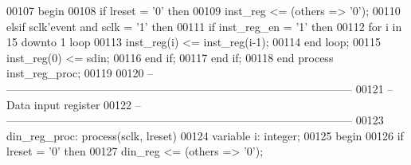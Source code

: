 \begin{DoxyCode}
00107 \textcolor{vhdlkeyword}{    begin}
00108         \textcolor{keywordflow}{if} \textcolor{vhdlchar}{lreset} \textcolor{vhdlchar}{=} \textcolor{vhdlchar}{'}\textcolor{vhdllogic}{}\textcolor{vhdllogic}{0}\textcolor{vhdlchar}{'} \textcolor{keywordflow}{then}
00109             inst\_reg <= (\textcolor{keywordflow}{others} => '0');
00110         \textcolor{keywordflow}{elsif} \textcolor{vhdlchar}{sclk}\textcolor{vhdlchar}{'}\textcolor{vhdlkeyword}{event} \textcolor{keywordflow}{and} \textcolor{vhdlchar}{sclk} \textcolor{vhdlchar}{=} \textcolor{vhdlchar}{'}\textcolor{vhdllogic}{}\textcolor{vhdllogic}{1}\textcolor{vhdlchar}{'} \textcolor{keywordflow}{then}
00111             \textcolor{keywordflow}{if} \textcolor{vhdlchar}{inst_reg_en} \textcolor{vhdlchar}{=} \textcolor{vhdlchar}{'}\textcolor{vhdllogic}{}\textcolor{vhdllogic}{1}\textcolor{vhdlchar}{'} \textcolor{keywordflow}{then}
00112                 \textcolor{keywordflow}{for} \textcolor{vhdlchar}{i} \textcolor{keywordflow}{in} \textcolor{vhdllogic}{}\textcolor{vhdllogic}{15} \textcolor{keywordflow}{downto} \textcolor{vhdllogic}{}\textcolor{vhdllogic}{1} \textcolor{keywordflow}{loop}
00113                     inst\_reg(i) <= inst\_reg(i-1);
00114                 \textcolor{keywordflow}{end} \textcolor{keywordflow}{loop};
00115                 inst\_reg(\textcolor{vhdllogic}{0}) <= sdin;
00116             \textcolor{keywordflow}{end} \textcolor{keywordflow}{if};
00117         \textcolor{keywordflow}{end} \textcolor{keywordflow}{if};
00118     \textcolor{keywordflow}{end} \textcolor{keywordflow}{process} \textcolor{vhdlchar}{inst\_reg\_proc};
00119 
00120 \textcolor{keyword}{    -- ---------------------------------------------------------------------------------------------}
00121 \textcolor{keyword}{    -- Data input register}
00122 \textcolor{keyword}{    -- ---------------------------------------------------------------------------------------------}
00123     din\_reg\_proc: \textcolor{keywordflow}{process}(sclk, lreset)
00124         \textcolor{keywordflow}{variable} \textcolor{vhdlchar}{i}\textcolor{vhdlchar}{:} \textcolor{comment}{integer};
00125 \textcolor{vhdlkeyword}{    begin}
00126         \textcolor{keywordflow}{if} \textcolor{vhdlchar}{lreset} \textcolor{vhdlchar}{=} \textcolor{vhdlchar}{'}\textcolor{vhdllogic}{}\textcolor{vhdllogic}{0}\textcolor{vhdlchar}{'} \textcolor{keywordflow}{then}
00127             \textcolor{vhdlchar}{din_reg} \textcolor{vhdlchar}{<=} \textcolor{vhdlchar}{(}\textcolor{keywordflow}{others} \textcolor{vhdlchar}{=}\textcolor{vhdlchar}{>} \textcolor{vhdlchar}{'}\textcolor{vhdllogic}{}\textcolor{vhdllogic}{0}\textcolor{vhdlchar}{'}\textcolor{vhdlchar}{)};

\end{DoxyCode}
